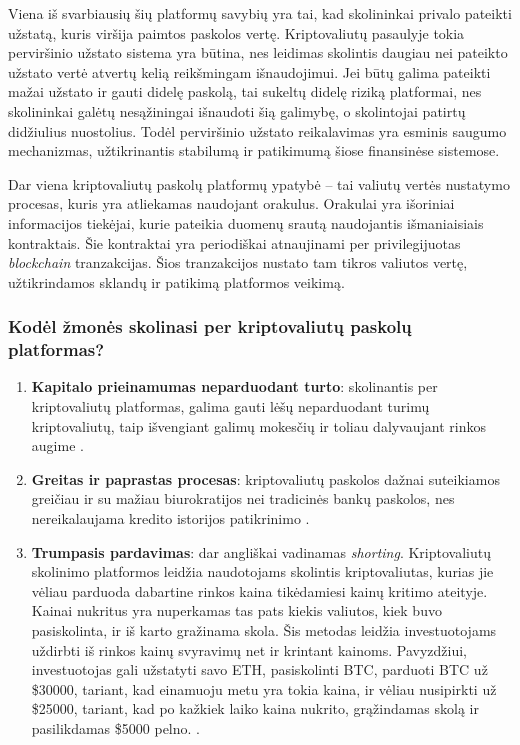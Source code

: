 \documentclass[]{VUMIFTemplateClass}
\begin{document}
Viena iš svarbiausių šių platformų savybių yra tai, kad skolininkai privalo pateikti užstatą, kuris viršija paimtos paskolos vertę. Kriptovaliutų pasaulyje tokia perviršinio užstato sistema yra būtina, nes leidimas skolintis daugiau nei pateikto užstato vertė atvertų kelią reikšmingam išnaudojimui. Jei būtų galima pateikti mažai užstato ir gauti didelę paskolą, tai sukeltų didelę riziką platformai, nes skolininkai galėtų nesąžiningai išnaudoti šią galimybę, o skolintojai patirtų didžiulius nuostolius. Todėl perviršinio užstato reikalavimas yra esminis saugumo mechanizmas, užtikrinantis stabilumą ir patikimumą šiose finansinėse sistemose.\cite{whatisdefiliquidation}

Dar viena kriptovaliutų paskolų platformų ypatybė -- tai valiutų vertės nustatymo procesas, kuris yra atliekamas naudojant orakulus. Orakulai yra išoriniai informacijos tiekėjai, kurie pateikia duomenų srautą naudojantis išmaniaisiais kontraktais. Šie kontraktai yra periodiškai atnaujinami per privilegijuotas \textit{blockchain} tranzakcijas. Šios tranzakcijos nustato tam tikros valiutos vertę, užtikrindamos sklandų ir patikimą platformos veikimą.

\subsubsection{Kodėl žmonės skolinasi per kriptovaliutų paskolų platformas?}

\begin{enumerate}
    \item \textbf{Kapitalo prieinamumas neparduodant turto}: skolinantis per kriptovaliutų platformas, galima gauti lėšų neparduodant turimų kriptovaliutų, taip išvengiant galimų mokesčių ir toliau dalyvaujant rinkos augime \cite{kriptovaliutosio}.
    \item \textbf{Greitas ir paprastas procesas}: kriptovaliutų paskolos dažnai suteikiamos greičiau ir su mažiau biurokratijos nei tradicinės bankų paskolos, nes nereikalaujama kredito istorijos patikrinimo \cite{targettrend}.
    \item \textbf{Trumpasis pardavimas}: dar angliškai vadinamas \textit{shorting}. Kriptovaliutų skolinimo platformos leidžia naudotojams skolintis kriptovaliutas, kurias jie vėliau parduoda dabartine rinkos kaina tikėdamiesi kainų kritimo ateityje. Kainai nukritus yra nuperkamas tas pats kiekis valiutos, kiek buvo pasiskolinta, ir iš karto gražinama skola. Šis metodas leidžia investuotojams uždirbti iš rinkos kainų svyravimų net ir krintant kainoms. Pavyzdžiui, investuotojas gali užstatyti savo ETH, pasiskolinti BTC, parduoti BTC už \$30000, tariant, kad einamuoju metu yra tokia kaina, ir vėliau nusipirkti už \$25000, tariant, kad po kažkiek laiko kaina nukrito, grąžindamas skolą ir pasilikdamas \$5000 pelno.
    \cite{shortinimas}.
\end{enumerate}
\end{document}
